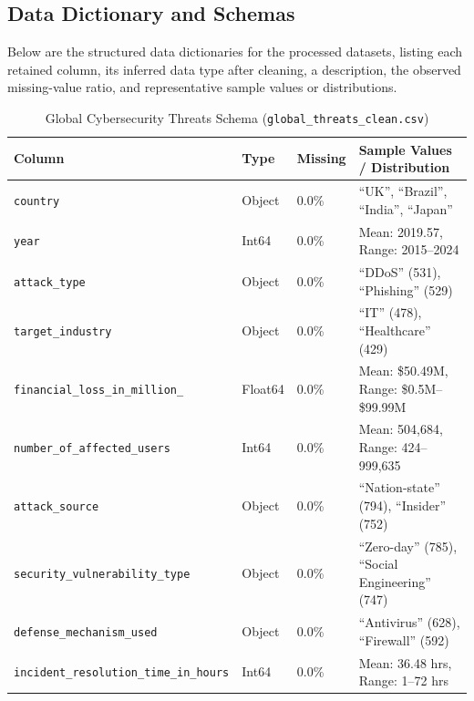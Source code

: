 \documentclass[a4paper, 12pt]{report}
\begin{document}
\subsection{Data Dictionary and Schemas}
Below are the structured data dictionaries for the processed datasets, listing each retained column, its inferred data type after cleaning, a description, the observed missing-value ratio, and representative sample values or distributions.

\begin{table}[h!]
\centering
\small
\caption{Global Cybersecurity Threats Schema (\texttt{global\_threats\_clean.csv})}
\begin{tabular}{lllp{6cm}}
\toprule
\textbf{Column} & \textbf{Type} & \textbf{Missing} & \textbf{Sample Values / Distribution} \\
\midrule
\texttt{country} & Object & 0.0\% & ``UK'', ``Brazil'', ``India'', ``Japan'' \\
\texttt{year} & Int64 & 0.0\% & Mean: 2019.57, Range: 2015--2024 \\
\texttt{attack\_type} & Object & 0.0\% & ``DDoS'' (531), ``Phishing'' (529) \\
\texttt{target\_industry} & Object & 0.0\% & ``IT'' (478), ``Healthcare'' (429) \\
\texttt{financial\_loss\_in\_million\_} & Float64 & 0.0\% & Mean: \$50.49M, Range: \$0.5M--\$99.99M \\
\texttt{number\_of\_affected\_users} & Int64 & 0.0\% & Mean: 504,684, Range: 424--999,635 \\
\texttt{attack\_source} & Object & 0.0\% & ``Nation-state'' (794), ``Insider'' (752) \\
\texttt{security\_vulnerability\_type} & Object & 0.0\% & ``Zero-day'' (785), ``Social Engineering'' (747) \\
\texttt{defense\_mechanism\_used} & Object & 0.0\% & ``Antivirus'' (628), ``Firewall'' (592) \\
\texttt{incident\_resolution\_time\_in\_hours} & Int64 & 0.0\% & Mean: 36.48 hrs, Range: 1--72 hrs \\
\bottomrule
\end{tabular}
\end{table}
\end{document}
